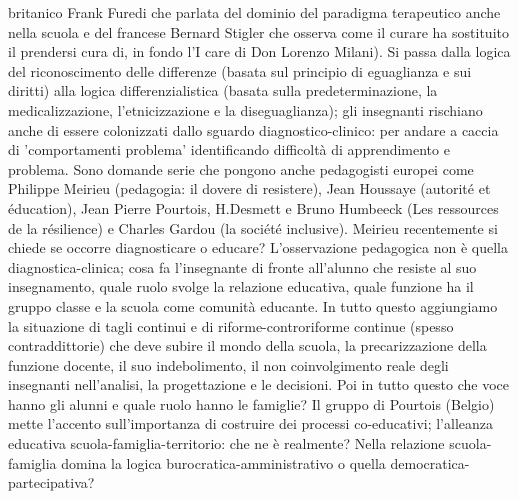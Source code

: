 britanico Frank Furedi che parlata del dominio del paradigma terapeutico anche nella scuola e del francese Bernard Stigler che osserva come il curare ha sostituito il prendersi cura di, in fondo l'I care di Don Lorenzo Milani). Si passa dalla logica del riconoscimento delle differenze (basata sul principio di eguaglianza e sui diritti) alla logica differenzialistica (basata sulla predeterminazione, la medicalizzazione, l'etnicizzazione e la diseguaglianza); gli insegnanti rischiano anche di essere colonizzati dallo sguardo diagnostico-clinico: per andare a caccia di 'comportamenti problema' identificando difficoltà di apprendimento e problema. Sono domande serie che pongono anche pedagogisti europei come Philippe Meirieu (pedagogia: il dovere di resistere), Jean Houssaye (autorité et éducation), Jean Pierre Pourtois, H.Desmett e Bruno Humbeeck (Les ressources de la résilience) e Charles Gardou (la société inclusive). Meirieu recentemente si chiede se occorre diagnosticare o educare? L'osservazione pedagogica non è quella diagnostica-clinica; cosa fa l'insegnante di fronte all'alunno che resiste al suo insegnamento, quale ruolo svolge la relazione educativa, quale funzione ha il gruppo classe e la scuola come comunità educante. In tutto questo aggiungiamo la situazione di tagli continui e di riforme-controriforme continue (spesso contraddittorie) che deve subire il mondo della scuola, la precarizzazione della funzione docente, il suo indebolimento, il non coinvolgimento reale degli insegnanti nell'analisi, la progettazione e le decisioni. Poi in tutto questo che voce hanno gli alunni e quale ruolo hanno le famiglie? Il gruppo di Pourtois (Belgio) mette l'accento sull'importanza di costruire dei processi co-educativi; l'alleanza educativa scuola-famiglia-territorio: che ne è realmente? Nella relazione scuola-famiglia domina la logica burocratica-amministrativo o quella democratica- partecipativa?

